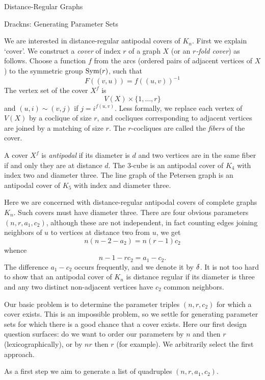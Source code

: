 \begin{chap}{Distance-Regular Graphs}
\begin{sect}{Drackns: Generating Parameter Sets}
\begin{para}
We are interested in distance-regular antipodal covers of $K_n$.
First we explain `cover'. We construct a \textsl{cover} of
index $r$ of a graph $X$ (or an \textsl{$r$-fold cover})
as follows. Choose a function $f$ from the arcs (ordered pairs of adjacent
vertices of $X$) to the symmetric group $\operatorname{Sym}(r)$, such that
\[
    F((v,u)) =f((u,v))^{-1}
\]
The vertex set of the cover $X^f$ is 
\[
    V(X)\times \{1,\ldots,r\}
\]
and $(u,i)\sim (v,j)$ if $j = i^{f(u,v)}$. Less formally, we replace each
vertex of $V(X)$ by a coclique of size $r$, and cocliques corresponding
to adjacent vertices are joined by a matching of size $r$. The $r$-cocliques
are called the \textsl{fibers} of the cover.
\end{para}
%
\begin{para}
A cover $X^f$ is \textsl{antipodal} if its diameter is $d$ and two vertices
are in the same fiber if and only they are at distance $d$. The 3-cube is an antipodal
cover of $K_4$ with index two and diameter three. The line graph of the Petersen
graph is an antipodal cover of $K_5$ with index and diameter three.
\end{para}
%
\begin{para}
Here we are concerned with distance-regular antipodal covers of complete graphs $K_n$.
Such covers must have diameter three. There are four obvious parameters $(n,r,a_1,c_2)$,
although these are not independent, in fact counting edges joining neighbors
of $u$ to vertices at distance two from $u$, we get
\[
    n(n-2-a_2) = n(r-1)c_2
\]
whence
\begin{equation}
\label{eq:n1rc2}
    n-1-rc_2 = a_1-c_2.
\end{equation}
The difference $a_1-c_2$ occurs frequently, and we denote it by $\delta$.
It is not too hard to show that an antipodal
cover of $K_n$ is distance regular if its diameter is three and any two 
distinct non-adjacent vertices have $c_2$ common neighbors.
\end{para}
%
\begin{para}
Our basic problem is to determine the parameter triples $(n,r,c_2)$
for which a cover exists. This is an impossible problem, so we settle
for generating parameter sets for which there is a good chance that a
cover exists. Here our first design question surfaces: do we want to order
our parameters by $n$ and then $r$ (lexicographically), or by $nr$ then $r$
(for example). We arbitrarily select the first approach.
\end{para}
%
\begin{para}
As a first step we aim to generate a list of quadruples $(n,r,a_1,c_2)$.

\end{para}
\end{sect}
\end{chap}
